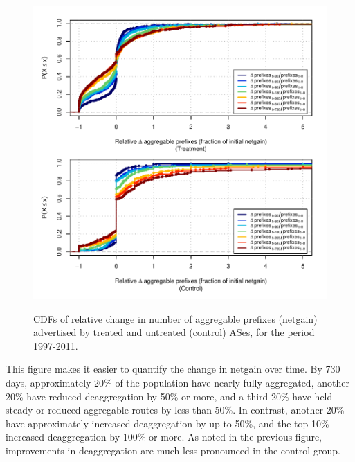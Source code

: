 \begin{figure}[h!]
\begin{centering}
\begin{singlespace}
\includegraphics[width=6in]{figures/behavior-rel_netgain-1997_2011-corr.pdf}
    \vspace{-2em}\\
    \caption{CDFs of relative change in number of aggregable prefixes (netgain)
    advertised by treated and untreated (control) ASes, for the period
    1997-2011.}
    \label{fig:delta_rel_netgain_cdf}
\end{singlespace}
\end{centering}
\end{figure}

This figure makes it easier to quantify the change in netgain over time. By 730
days, approximately 20\% of the population have nearly fully aggregated,
another 20\% have reduced deaggregation by 50\% or more, and a third 20\% have
held steady or reduced aggregable routes by less than 50\%. In contrast,
another 20\% have approximately increased deaggregation by up to 50\%, and the
top 10\% increased deaggregation by 100\% or more. As noted in the previous
figure, improvements in deaggregation are much less pronounced in the control
group.

